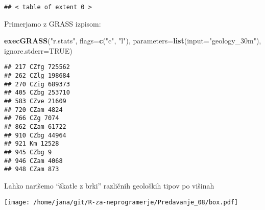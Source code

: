 \documentclass[]{article}
\newenvironment{Shaded}{\begin{snugshade}}{\end{snugshade}}
\newcommand{\KeywordTok}[1]{\textcolor[rgb]{0.13,0.29,0.53}{\textbf{#1}}}
\newcommand{\DataTypeTok}[1]{\textcolor[rgb]{0.13,0.29,0.53}{#1}}
\newcommand{\StringTok}[1]{\textcolor[rgb]{0.31,0.60,0.02}{#1}}
\newcommand{\OtherTok}[1]{\textcolor[rgb]{0.56,0.35,0.01}{#1}}
\newcommand{\OperatorTok}[1]{\textcolor[rgb]{0.81,0.36,0.00}{\textbf{#1}}}
\newcommand{\NormalTok}[1]{#1}
\begin{document}
\begin{Shaded}
\end{Shaded}

\begin{verbatim}
## < table of extent 0 >
\end{verbatim}

Primerjamo z GRASS izpisom:

\begin{Shaded}
\begin{Highlighting}[]
\KeywordTok{execGRASS}\NormalTok{(}\StringTok{"r.stats"}\NormalTok{, }\DataTypeTok{flags=}\KeywordTok{c}\NormalTok{(}\StringTok{"c"}\NormalTok{, }\StringTok{"l"}\NormalTok{), }\DataTypeTok{parameters=}\KeywordTok{list}\NormalTok{(}\DataTypeTok{input=}\StringTok{"geology_30m"}\NormalTok{), }\DataTypeTok{ignore.stderr=}\OtherTok{TRUE}\NormalTok{)}
\end{Highlighting}
\end{Shaded}

\begin{verbatim}
## 217 CZfg 725562
## 262 CZlg 198684
## 270 CZig 689373
## 405 CZbg 253710
## 583 CZve 21609
## 720 CZam 4824
## 766 CZg 7074
## 862 CZam 61722
## 910 CZbg 44964
## 921 Km 12528
## 945 CZbg 9
## 946 CZam 4068
## 948 CZam 873
\end{verbatim}

Lahko narišemo ``škatle z brki'' različnih geoloških tipov po višinah

\texttt{[image: /home/jana/git/R-za-neprogramerje/Predavanje\_08/box.pdf]}
\end{document}
